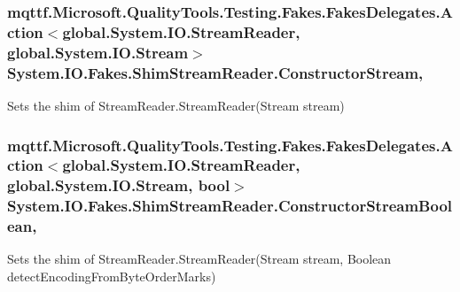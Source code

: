 \hypertarget{class_system_1_1_i_o_1_1_fakes_1_1_shim_stream_reader_a78a50cb5bf04642828ce6750251c806d}{
\subsubsection[{Constructor\-Stream}]{\setlength{\rightskip}{0pt plus 5cm}mqttf.\-Microsoft.\-Quality\-Tools.\-Testing.\-Fakes.\-Fakes\-Delegates.\-Action$<$global.\-System.\-I\-O.\-Stream\-Reader, global.\-System.\-I\-O.\-Stream$>$ System.\-I\-O.\-Fakes.\-Shim\-Stream\-Reader.\-Constructor\-Stream\hspace{0.3cm}{\ttfamily [static]}, {\ttfamily [set]}}}\label{class_system_1_1_i_o_1_1_fakes_1_1_shim_stream_reader_a78a50cb5bf04642828ce6750251c806d}


Sets the shim of Stream\-Reader.\-Stream\-Reader(\-Stream stream)

\hypertarget{class_system_1_1_i_o_1_1_fakes_1_1_shim_stream_reader_a20b8490785bde7ff5cd4ef1ac9749a06}{
\subsubsection[{Constructor\-Stream\-Boolean}]{\setlength{\rightskip}{0pt plus 5cm}mqttf.\-Microsoft.\-Quality\-Tools.\-Testing.\-Fakes.\-Fakes\-Delegates.\-Action$<$global.\-System.\-I\-O.\-Stream\-Reader, global.\-System.\-I\-O.\-Stream, bool$>$ System.\-I\-O.\-Fakes.\-Shim\-Stream\-Reader.\-Constructor\-Stream\-Boolean\hspace{0.3cm}{\ttfamily [static]}, {\ttfamily [set]}}}\label{class_system_1_1_i_o_1_1_fakes_1_1_shim_stream_reader_a20b8490785bde7ff5cd4ef1ac9749a06}


Sets the shim of Stream\-Reader.\-Stream\-Reader(\-Stream stream, Boolean detect\-Encoding\-From\-Byte\-Order\-Marks)

